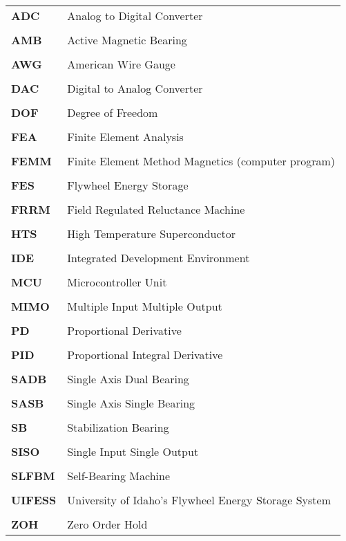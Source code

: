 \begin{tabular}{ >{\bfseries}l @{\hskip 1in} l }
ADC & Analog to Digital Converter \\ \\
AMB & Active Magnetic Bearing \\ \\
AWG & American Wire Gauge \\ \\
DAC & Digital to Analog Converter \\ \\
DOF & Degree of Freedom \\ \\
FEA & Finite Element Analysis \\ \\
FEMM & Finite Element Method Magnetics (computer program) \\ \\
FES & Flywheel Energy Storage \\ \\
FRRM & Field Regulated Reluctance Machine \\ \\
HTS & High Temperature Superconductor \\ \\
IDE & Integrated Development Environment \\ \\
MCU & Microcontroller Unit \\ \\
MIMO & Multiple Input Multiple Output \\ \\
PD & Proportional Derivative \\ \\
PID & Proportional Integral Derivative \\ \\
SADB & Single Axis Dual Bearing \\ \\
SASB & Single Axis Single Bearing \\ \\
SB & Stabilization Bearing \\ \\
SISO & Single Input Single Output \\ \\
SLFBM & Self-Bearing Machine \\ \\
UIFESS & University of Idaho's Flywheel Energy Storage System \\ \\
ZOH & Zero Order Hold
\end{tabular}